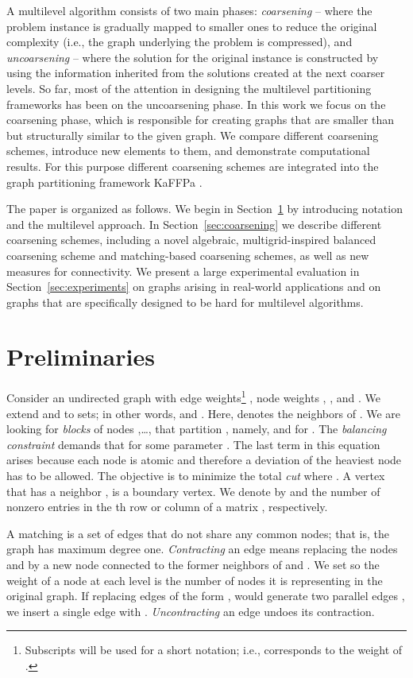 \documentclass{llncs}
\begin{document}
A multilevel algorithm consists of two main phases: \emph{coarsening} -- where the problem instance is  gradually mapped to smaller ones to reduce the original complexity (i.e., the graph underlying the problem is compressed), 
and \emph{uncoarsening} -- where the solution for the original instance is constructed by using the information inherited from the solutions created at the next coarser levels. 
 So far, most of the attention in designing the multilevel partitioning frameworks has been on the uncoarsening phase. In this work we focus on the coarsening phase, which is responsible for creating  graphs that are smaller than but structurally similar to the given graph. We compare different coarsening schemes, introduce new elements to them, and demonstrate computational results. For this purpose different coarsening schemes are integrated into the graph partitioning framework KaFFPa \cite{kaffpa}.

The paper is organized as follows. We begin in Section~\ref{sec:preliminaries} by introducing notation  and the multilevel approach. 
In Section~\ref{sec:coarsening} we describe different coarsening schemes, including a novel algebraic, multigrid-inspired balanced coarsening scheme and matching-based coarsening schemes, as well as new measures for connectivity. 
We present a large experimental evaluation in Section~\ref{sec:experiments} on graphs arising in real-world applications and on graphs that are specifically designed to be hard for multilevel algorithms.

\section{Preliminaries}
\label{sec:preliminaries}
Consider an undirected graph 
with edge weights\footnote{Subscripts will be used for a short notation; i.e.,  corresponds to the weight of .} , node weights
, , and .
We extend  and  to sets; in other words,
 and .
Here,  denotes the neighbors of .
We are looking for \emph{blocks} of nodes ,\ldots,
that partition , namely,  and 
for . The \emph{balancing constraint} demands that
 for
some parameter .
The last term in this equation arises because each node is atomic and
therefore a deviation of the heaviest node has to be allowed.
The objective is to minimize the total \emph{cut}  where
.
A vertex  that has a neighbor , is a boundary vertex.
We denote by  and  the number of nonzero entries in the th row or column of a matrix , respectively.

A matching  is a set of edges that do not share any common nodes; that is, the graph  has maximum degree one.  \emph{Contracting} an edge  means replacing the nodes  and  by a new node  connected
to the former neighbors of  and .
We set  so the weight of a node at each level is the number of nodes it is representing in the original graph. If replacing edges of the form , would generate two parallel edges , we insert a single edge with
.
\emph{Uncontracting} an edge  undoes its contraction.
\end{document}
